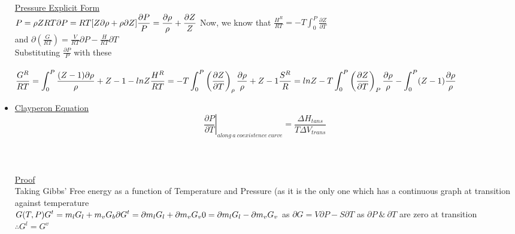 \documentclass[12pt]{article}
\begin{document}
\begin{itemize}
	\underline{Pressure Explicit Form}\\
	$\displaystyle P=\rho ZRT\\
	\partial P=RT[Z\partial\rho+\rho\partial Z]\\
	\frac{\partial P}{P}=\frac{\partial\rho}{\rho}+\frac{\partial Z}{Z}$
	Now, we know that
	$\displaystyle \frac{H^R}{RT}=-T\int^P_0\frac{\partial Z}{\partial T}$\\
	and 
	$\displaystyle \partial\left(\frac{G}{RT}\right)=\frac{V}{RT}\partial P-\frac{H}{RT}\partial T$\\
	Substituting $\displaystyle \frac{\partial P}{P}$ with these\\\\
	$\displaystyle \frac{G^R}{RT}=\int^P_0\frac{(Z-1)\partial\rho}{\rho}+Z-1-lnZ\\
	\frac{H^R}{RT}=-T\int^P_0\left(\frac{\partial Z}{\partial T}\right)_\rho\frac{\partial \rho}{\rho}+Z-1\\
	\frac{S^R}{R}=lnZ-T\int^P_0\left(\frac{\partial Z}{\partial T}\right)_P\frac{\partial \rho}{\rho}-\int^P_0(Z-1)\frac{\partial\rho}{\rho}$
	\item\underline{Clayperon Equation}\
	\[\left.\frac{\partial P}{\partial T}\right\rvert_{along\ a\ coexistence\ curve}=\frac{\Delta H_{tans}}{T\Delta V_{trans}}\]\\ \\ \\
	\underline{Proof}\\
	Taking Gibbs' Free energy as a function of Temperature and Pressure (as it is the only one which has a continuous graph at transition against temperature\\
	$\displaystyle G(T,P)\\
	G^t=m_lG_l+m_vG_b\\
	\partial G^t=\partial m_lG_l+\partial m_vG_v\\
	0=\partial m_lG_l-\partial m_vG_v\\$
	as $\partial G=V\partial P-S\partial T$ as $\partial P\ \&\ \partial T$ are zero at transition\\
	$\therefore G^l=G^v$\\
	


\begin{tikzpicture}[x=0.75pt,y=0.75pt,yscale=-1,xscale=1]


\end{tikzpicture}
\end{itemize}
\end{document}
